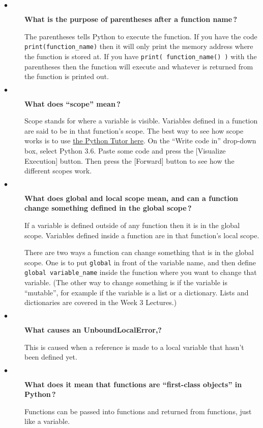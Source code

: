 \documentclass{article}
\newcommand{\inlinecode}[1]{\texttt{#1}}
\newcommand{\link}[2]{\textcolor{blue}{\href{#2}{#1}}}
\newcommand{\question}[1]{\item[$\bullet$] 
	\begin{minipage}[t]{\textwidth}
		\bfseries#1
	\end{minipage}
	\hfil
}
\newenvironment{answer}{}{}
\newenvironment{faq}{\begin{description}}{\end{description}}
\begin{document}
\begin{faq}
		\question{What is the purpose of parentheses after a function name\,?}
		\begin{answer}
			The parentheses tells Python to execute the function. If you have the code \inlinecode{print(function_name)} then it will only print the memory address where the function is stored at. If you have \inlinecode{print( function_name() )} with the parentheses then the function will execute and whatever is returned from the function is printed out.
		\end{answer}
		
		\question{What does ``scope'' mean\,?}
		\begin{answer}
			Scope stands for where a variable is visible.  Variables defined in a function are said to be in that function's scope.  The best way to see how scope works is to use \link{the Python Tutor here}{http://www.pythontutor.com/visualize.html\#mode=edit}.  On the ``Write code in'' drop-down box, select Python 3.6.  Paste some code and press the [Visualize Execution] button.  Then press the [Forward] button to see how the different scopes work.
		\end{answer}
		
		\question{What does global and local scope mean, and can a function change something defined in the global scope\,?}
		\begin{answer}
			If a variable is defined outside of any function then it is in the global scope.  Variables defined inside a function are in that function's local scope.  
			
			There are two ways a function can change something that is in the global scope.  One is to put \inlinecode{global} in front of the variable name, and then define \inlinecode{global variable_name} inside the function where you want to change that variable.  (The other way to change something is if the variable is ``mutable'', for example if the variable is a list or a dictionary.  Lists and dictionaries are covered in the Week 3 Lectures.)
		\end{answer}
		
		\question{What causes an UnboundLocalError,?}
		\begin{answer}
			This is caused when a reference is made to a local variable that hasn't been defined yet.
		\end{answer}
		
		\question{What does it mean that functions are ``first-class objects'' in Python\,?}
		\begin{answer}
			Functions can be passed into functions and returned from functions, just like a variable.
		\end{answer}
		

\end{faq}
\end{document}

